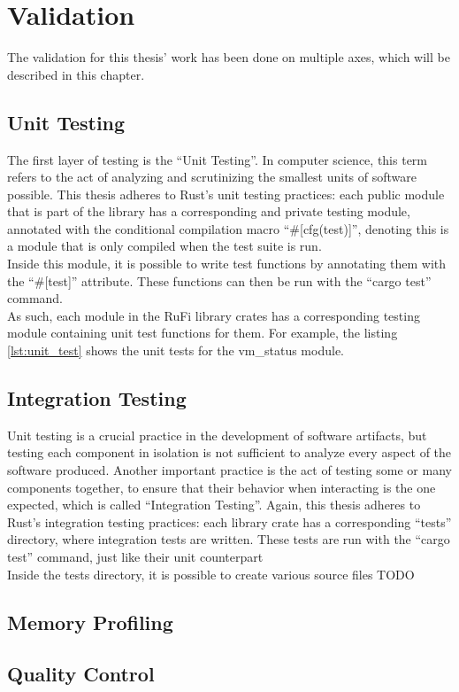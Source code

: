 
\chapter{Validation}
\label{chap:validation}

The validation for this thesis' work has been done on multiple axes, which will be described in this chapter.

\section{Unit Testing}
The first layer of testing is the ``Unit Testing''. In computer science, this term refers to the act of analyzing and scrutinizing the smallest units of software possible.
This thesis adheres to Rust's unit testing practices: each public module that is part of the library has a corresponding and private testing module, annotated with the
conditional compilation macro ``\#[cfg(test)]'', denoting this is a module that is only compiled when the test suite is run.\\
Inside this module, it is possible to write test functions by annotating them with the ``\#[test]'' attribute. These functions can then be run with the ``cargo test'' command.\\
As such, each module in the RuFi library crates has a corresponding testing module containing unit test functions for them. For example, the listing \ref{lst:unit_test} shows the unit tests for the
vm\_status module.



\section{Integration Testing}
Unit testing is a crucial practice in the development of software artifacts, but testing each component in isolation is not sufficient to analyze every aspect of the software produced.
Another important practice is the act of testing some or many components together, to ensure that their behavior when interacting is the one expected, which is called ``Integration Testing''.
Again, this thesis adheres to Rust's integration testing practices: each library crate has a corresponding ``tests'' directory, where integration tests are written. These tests are run with the ``cargo test'' command, just like their unit counterpart\\
Inside the tests directory, it is possible to create various source files TODO

\section{Memory Profiling}

\section{Quality Control}
